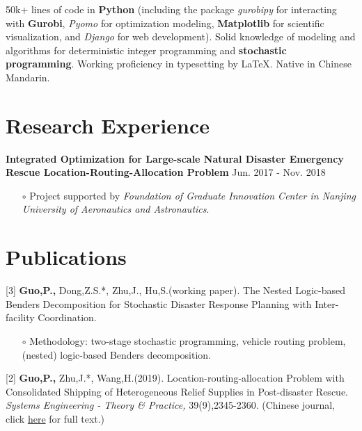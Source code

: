 \documentclass[margin]{res}
\begin{document}
\begin{resume}
50k+ lines of code in {\bf Python} (including the package {\it gurobipy} for interacting with {\bf Gurobi}, {\it Pyomo} for optimization modeling, {\bf Matplotlib} for scientific visualization, and {\it Django} for web development). 
Solid knowledge of modeling and algorithms for deterministic integer programming and {\bf stochastic programming}. 
Working proficiency in typesetting by \LaTeX. Native in Chinese Mandarin.





\section{\sc Research Experience}

\textbf{{Integrated Optimization for Large-scale Natural Disaster Emergency Rescue Location-Routing-Allocation Problem}} \hspace{68pt} Jun. 2017 - Nov. 2018
\begin{itemize} \itemsep -2pt  %
\item[\(\circ\)] Project supported by {\it Foundation of Graduate Innovation Center in Nanjing University of Aeronautics and Astronautics}.
\end{itemize}




\section{\sc Publications}

[3] \textbf{Guo,P.,} Dong,Z.S.*, Zhu,J., Hu,S.(working paper). The Nested Logic-based Benders Decomposition for Stochastic Disaster Response Planning with Inter-facility Coordination.
\begin{itemize} \itemsep -2pt  %
\item[\(\circ\)] Methodology: two-stage stochastic programming, vehicle routing problem, (nested) logic-based Benders decomposition.
\end{itemize} \vspace{-.5em}

[2] \textbf{Guo,P.,} Zhu,J.*, Wang,H.(2019). Location-routing-allocation Problem with Consolidated Shipping of Heterogeneous Relief Supplies in Post-disaster Rescue. \textit{Systems Engineering - Theory \& Practice,} 39(9),2345-2360. (Chinese journal, click \href{https://docs.google.com/viewer?url=https://github.com/phguo/phguo.github.io/raw/master/full_text/zh-LocationRoutingAllocation.pdf}{here} for full text.)


\end{resume}
\end{document}
